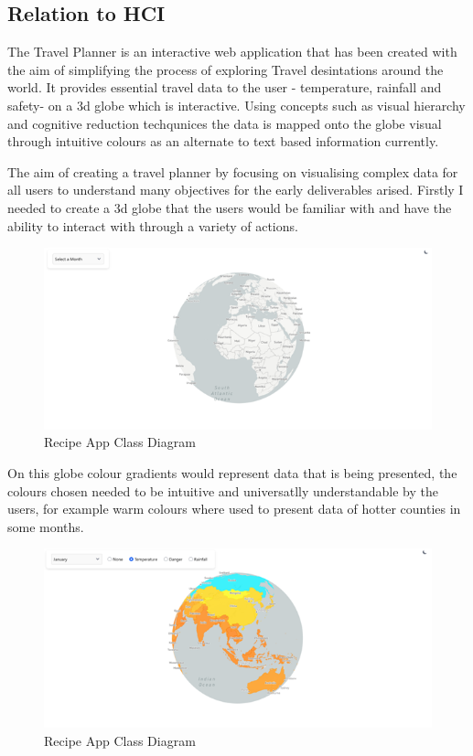 \documentclass[]{project_interim}
\begin{document}
\subsection{Relation to HCI}

The Travel Planner is an interactive web application that has been created with the aim of simplifying the process of exploring Travel desintations around the world. It provides essential travel data to the user - temperature, rainfall and safety- on a 3d globe which is interactive. Using concepts such as visual hierarchy and cognitive reduction techqunices the data is mapped onto the globe visual through intuitive colours as an alternate to text based information currently.

The aim of creating a travel planner by focusing on visualising complex data for all users to understand many objectives for the early deliverables arised.
Firstly I needed to create a 3d globe that the users would be familiar with and have the ability to interact with through a variety of actions.

\begin{figure}[ht!]
  \centering
  \includegraphics[width=\textwidth]{TP-plain.png}
  \vspace*{0.0cm}
  \caption{Recipe App Class Diagram}
  \label{fig:1}
\end{figure}

\newpage

On this globe colour gradients would represent data that is being presented, the colours chosen needed to be intuitive and universatlly understandable by the users, for example warm colours where used to present data of hotter counties in some months.

\begin{figure}[ht!]
  \centering
  \includegraphics[width=\textwidth]{TP-Temp.png}
  \vspace*{0.0cm}
  \caption{Recipe App Class Diagram}
  \label{fig:1}
\end{figure}
\end{document}
